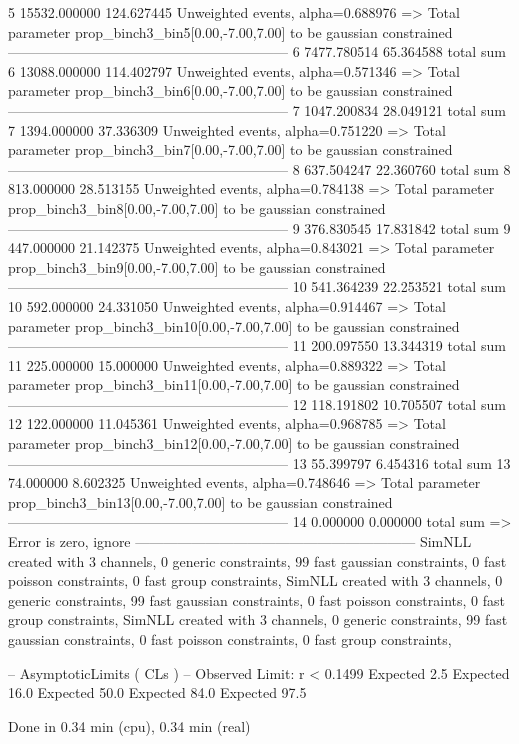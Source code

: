 5          15532.000000    124.627445      Unweighted events, alpha=0.688976
  => Total parameter prop_binch3_bin5[0.00,-7.00,7.00] to be gaussian constrained
------------------------------------------------------------
6          7477.780514     65.364588       total sum                     
6          13088.000000    114.402797      Unweighted events, alpha=0.571346
  => Total parameter prop_binch3_bin6[0.00,-7.00,7.00] to be gaussian constrained
------------------------------------------------------------
7          1047.200834     28.049121       total sum                     
7          1394.000000     37.336309       Unweighted events, alpha=0.751220
  => Total parameter prop_binch3_bin7[0.00,-7.00,7.00] to be gaussian constrained
------------------------------------------------------------
8          637.504247      22.360760       total sum                     
8          813.000000      28.513155       Unweighted events, alpha=0.784138
  => Total parameter prop_binch3_bin8[0.00,-7.00,7.00] to be gaussian constrained
------------------------------------------------------------
9          376.830545      17.831842       total sum                     
9          447.000000      21.142375       Unweighted events, alpha=0.843021
  => Total parameter prop_binch3_bin9[0.00,-7.00,7.00] to be gaussian constrained
------------------------------------------------------------
10         541.364239      22.253521       total sum                     
10         592.000000      24.331050       Unweighted events, alpha=0.914467
  => Total parameter prop_binch3_bin10[0.00,-7.00,7.00] to be gaussian constrained
------------------------------------------------------------
11         200.097550      13.344319       total sum                     
11         225.000000      15.000000       Unweighted events, alpha=0.889322
  => Total parameter prop_binch3_bin11[0.00,-7.00,7.00] to be gaussian constrained
------------------------------------------------------------
12         118.191802      10.705507       total sum                     
12         122.000000      11.045361       Unweighted events, alpha=0.968785
  => Total parameter prop_binch3_bin12[0.00,-7.00,7.00] to be gaussian constrained
------------------------------------------------------------
13         55.399797       6.454316        total sum                     
13         74.000000       8.602325        Unweighted events, alpha=0.748646
  => Total parameter prop_binch3_bin13[0.00,-7.00,7.00] to be gaussian constrained
------------------------------------------------------------
14         0.000000        0.000000        total sum                     
  => Error is zero, ignore      
------------------------------------------------------------
SimNLL created with 3 channels, 0 generic constraints, 99 fast gaussian constraints, 0 fast poisson constraints, 0 fast group constraints, 
SimNLL created with 3 channels, 0 generic constraints, 99 fast gaussian constraints, 0 fast poisson constraints, 0 fast group constraints, 
SimNLL created with 3 channels, 0 generic constraints, 99 fast gaussian constraints, 0 fast poisson constraints, 0 fast group constraints, 

 -- AsymptoticLimits ( CLs ) --
Observed Limit: r < 0.1499
Expected  2.5%
Expected 16.0%
Expected 50.0%
Expected 84.0%
Expected 97.5%

Done in 0.34 min (cpu), 0.34 min (real)
